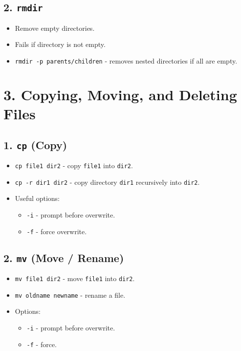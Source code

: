\documentclass[a4paper]{report}
\begin{document}
\subsection*{2. \texttt{rmdir}}
\begin{itemize}
    \item Remove empty directories.
    \item Fails if directory is not empty.
    \item \texttt{rmdir -p parents/children} \text{-}- removes nested directories if all are empty.
\end{itemize}

\section*{3. Copying, Moving, and Deleting Files}
\subsection*{1. \texttt{cp} (Copy)}
\begin{itemize}
    \item \texttt{cp file1 dir2} \text{-}- copy \texttt{file1} into \texttt{dir2}.
    \item \texttt{cp -r dir1 dir2} \text{-}- copy directory \texttt{dir1} recursively into \texttt{dir2}.
    \item Useful options:
    \begin{itemize}
        \item \texttt{-i} \text{-}- prompt before overwrite.
        \item \texttt{-f} \text{-}- force overwrite.
    \end{itemize}
\end{itemize}

\subsection*{2. \texttt{mv} (Move / Rename)}
\begin{itemize}
    \item \texttt{mv file1 dir2} \text{-}- move \texttt{file1} into \texttt{dir2}.
    \item \texttt{mv oldname newname} \text{-}- rename a file.
    \item Options:
    \begin{itemize}
        \item \texttt{-i} \text{-}- prompt before overwrite.
        \item \texttt{-f} \text{-}- force.
    \end{itemize}
\end{itemize}
\end{document}
